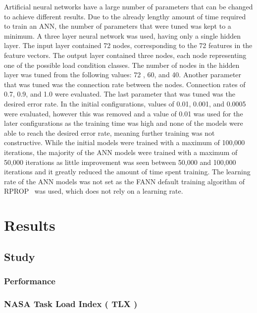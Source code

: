 \documentclass[11pt]{article}
\begin{document}
		Artificial neural networks have a large number of parameters that can be changed to achieve different results. Due to the already lengthy amount of time required to train an ANN, the number of parameters that were tuned was kept to a minimum. A three layer neural network was used, having only a single hidden layer. The input layer contained 72 nodes, corresponding to the 72 features in the feature vectors. The output layer contained three nodes, each node representing one of the possible load condition classes. The number of nodes in the hidden layer was tuned from the following values: 72 , 60, and 40. Another parameter that was tuned was the connection rate between the nodes. Connection rates of 0.7, 0.9, and 1.0 were evaluated. The last parameter that was tuned was the desired error rate. In the initial configurations, values of 0.01, 0.001, and 0.0005 were evaluated, however this was removed and a value of 0.01 was used for the later configurations as the training time was high and none of the models were able to reach the desired error rate, meaning further training was not constructive. While the initial models were trained with a maximum of 100,000 iterations, the majority of the ANN models were trained with a maximum of 50,000 iterations as little improvement was seen between 50,000 and 100,000 iterations and it greatly reduced the amount of time spent training. The learning rate of the ANN models was not set as the FANN default training algorithm of RPROP~\cite{Riedmiller} was used, which does not rely on a learning rate.

\section{Results}

	\subsection{Study}
		
		\subsubsection{Performance}
		
		\subsubsection{NASA Task Load Index ( TLX )}
		
\end{document}
